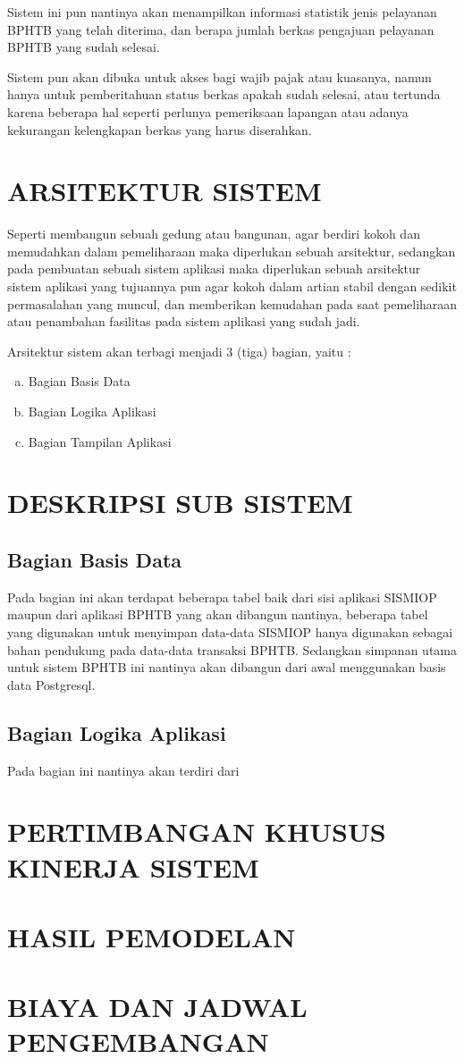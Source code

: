 \documentclass[pdftex,12pt, oneside]{article}
\begin{document}
Sistem ini pun nantinya akan menampilkan informasi statistik jenis pelayanan BPHTB yang telah diterima, dan berapa jumlah berkas pengajuan pelayanan BPHTB yang sudah selesai.

Sistem pun akan dibuka untuk akses bagi wajib pajak atau kuasanya, namun hanya untuk pemberitahuan status berkas apakah sudah selesai, atau tertunda karena beberapa hal seperti perlunya pemeriksaan lapangan atau adanya kekurangan kelengkapan berkas yang harus diserahkan.


\section{ARSITEKTUR SISTEM}

Seperti membangun sebuah gedung atau bangunan, agar berdiri kokoh dan memudahkan dalam pemeliharaan maka diperlukan sebuah arsitektur, sedangkan pada pembuatan sebuah sistem aplikasi maka diperlukan sebuah arsitektur sistem aplikasi yang tujuannya pun agar kokoh dalam artian stabil dengan sedikit permasalahan yang muncul, dan memberikan kemudahan pada saat pemeliharaan atau penambahan fasilitas pada sistem aplikasi yang sudah jadi.

Arsitektur sistem akan terbagi menjadi 3 (tiga) bagian, yaitu :

\begin{enumerate}[a.] 
\item Bagian Basis Data

\item Bagian Logika Aplikasi

\item Bagian Tampilan Aplikasi
\end{enumerate}

\section{DESKRIPSI SUB SISTEM}

\subsection{Bagian Basis Data}

Pada bagian ini akan terdapat beberapa tabel baik dari sisi aplikasi SISMIOP maupun dari aplikasi BPHTB yang akan dibangun nantinya, beberapa tabel yang digunakan untuk menyimpan data-data SISMIOP hanya digunakan sebagai bahan pendukung pada data-data transaksi BPHTB. Sedangkan simpanan utama untuk sistem BPHTB ini nantinya akan dibangun dari awal menggunakan basis data Postgresql.

\subsection{Bagian Logika Aplikasi}

Pada bagian ini nantinya akan terdiri dari 

\section{PERTIMBANGAN KHUSUS KINERJA SISTEM}


\section{HASIL PEMODELAN}


\section{BIAYA DAN JADWAL PENGEMBANGAN}
\end{document}
